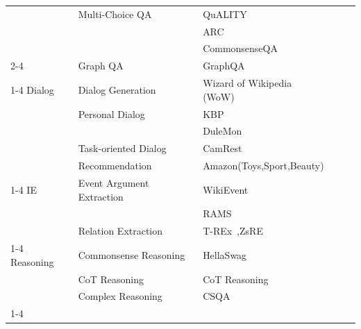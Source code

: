 \begin{table}[]
\begin{tabular}{@{}lllll@{}}
                       & Multi-Choice QA            & QuALITY~                   &                                      &  \\
                       &                            & ARC~                       &                                                  &  \\
                       &                            & CommonsenseQA~             &                                                      &  \\ \cmidrule(lr){2-4}
                       & Graph QA                   & GraphQA~                   &                                                 &  \\ \cmidrule(r){1-4}
Dialog                 & Dialog Generation          & Wizard of Wikipedia (WoW)~ &                                    &  \\
                       & Personal Dialog            & KBP~                       &                                              &  \\
                       &                            & DuleMon~                   &                                                     &  \\
                       & Task-oriented Dialog           & CamRest~              &                                      &  \\
                       & Recommendation             & Amazon(Toys,Sport,Beauty)~ &                                             &  \\ \cmidrule(r){1-4}
IE & Event Argument Extraction  & WikiEvent                 &                                    &  \\
                       &                            & RAMS~                      &                                           &  \\
                       & Relation Extraction                         & T-REx~,ZsRE~                &                                                    &  \\ \cmidrule(r){1-4}
Reasoning              & Commonsense Reasoning      & HellaSwag~            &                                                   &  \\
                       & CoT Reasoning              & CoT Reasoning~             &                                   &  \\
                       & Complex Reasoning          & CSQA~                     &                                                           &  \\ \cmidrule(r){1-4}

\end{tabular}
\end{table}
